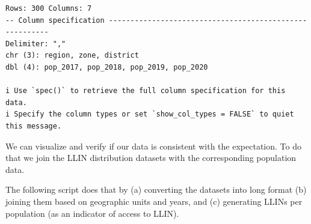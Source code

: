 \documentclass[
  letterpaper,
  DIV=11,
  numbers=noendperiod]{scrreprt}
\begin{document}
\begin{verbatim}
Rows: 300 Columns: 7
-- Column specification --------------------------------------------------------
Delimiter: ","
chr (3): region, zone, district
dbl (4): pop_2017, pop_2018, pop_2019, pop_2020

i Use `spec()` to retrieve the full column specification for this data.
i Specify the column types or set `show_col_types = FALSE` to quiet this message.
\end{verbatim}

We can visualize and verify if our data is consistent with the
expectation. To do that we join the LLIN distribution datasets with the
corresponding population data.

The following script does that by (a) converting the datasets into long
format (b) joining them based on geographic units and years, and (c)
generating LLINs per population (as an indicator of access to LLIN).
\end{document}

